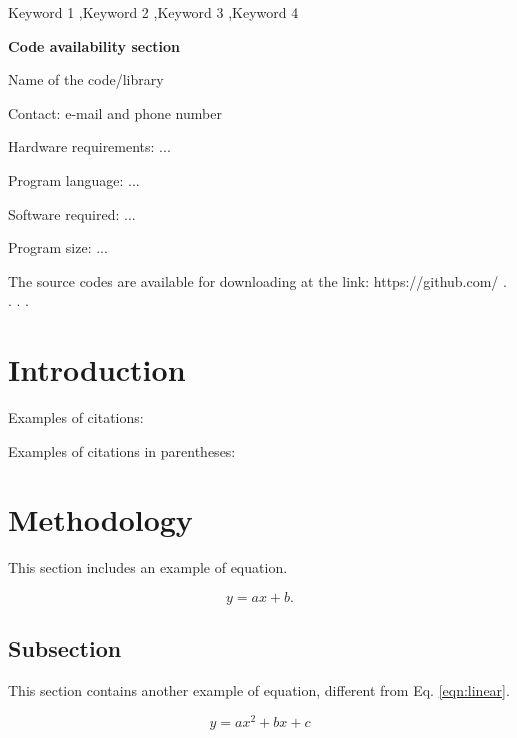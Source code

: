 \documentclass[a4paper,fleqn]{cas-sc}
\begin{document}
\begin{keywords}
Keyword 1 \sep Keyword 2 \sep Keyword 3 \sep Keyword 4
\end{keywords}

\maketitle 

\doublespacing

\textbf{Code availability section}

Name of the code/library

Contact: e-mail and phone number

Hardware requirements: ...

Program language: ...
 
Software required: ...

Program size: ...

The source codes are available for downloading at the link:
https://github.com/ . . . . 

\section{Introduction}
\label{intro}



Examples of citations:

\cite{gomez1990isim3d, pebesma2004multivariable, hansen2018multiple}

Examples of citations in parentheses: 

\citep{gomez1990isim3d, pebesma2004multivariable, hansen2018multiple}

\section{Methodology}

This section includes an example of equation. 
 
\begin{equation}
\label{eqn:linear}
    y=ax+b.
\end{equation}


\subsection{Subsection}

This section contains another example of equation, different from Eq.  \ref{eqn:linear}.

\begin{equation} 
\label{eqn:quadratic}
    y=ax^2+bx+c
\end{equation}
\end{document}
